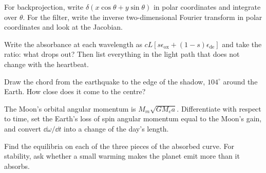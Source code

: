 
 For backprojection, write $\delta(x\cos\theta+y\sin\theta)$ in polar coordinates and integrate over $\theta$. For the filter, write the inverse two-dimensional Fourier transform in polar coordinates and look at the Jacobian.

 Write the absorbance at each wavelength as $cL[s\epsilon_{\text{ox}} + (1-s)\epsilon_{\text{de}}]$ and take the ratio: what drops out? Then list everything in the light path that does not change with the heartbeat.


 Draw the chord from the earthquake to the edge of the shadow, $104^\circ$ around the Earth. How close does it come to the centre?

 The Moon's orbital angular momentum is $M_m\sqrt{GM_ea}$. Differentiate with respect to time, set the Earth's loss of spin angular momentum equal to the Moon's gain, and convert $\dd\omega/\dd t$ into a change of the day's length.

 Find the equilibria on each of the three pieces of the absorbed curve. For stability, ask whether a small warming makes the planet emit more than it absorbs.
